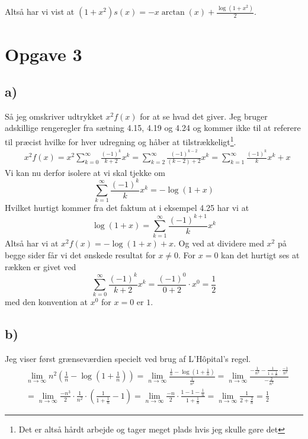\documentclass{article}
\newcommand{\lr}[1]{\left( #1\right)}
\begin{document}
Altså har vi vist at $(1 + x^2) s(x) = -x\arctan(x) + \frac{\log(1+x^2)}{2}$.

\section{Opgave 3}
\subsection*{a)}
Så jeg omskriver udtrykket $x^2f(x)$ for at se hvad det giver. Jeg bruger adskillige rengeregler
fra sætning 4.15, 4.19 og 4.24 \cite{an1} og kommer ikke til at referere til præcist hvilke for hver udregning
og håber at tilstrækkeligt\footnote{Det er altså hårdt arbejde og tager meget plads hvis jeg skulle gøre det}.
\begin{align*}
    &x^2 f(x) = x^2 \sum_{k=0}^{\infty} \frac{(-1)^k}{k+2} x^k 
    = \sum_{k=2}^{\infty} \frac{(-1)^{k-2}}{(k-2)+2} x^{k}
    = \sum_{k=1}^{\infty} \frac{(-1)^{k}}{k} x^{k} + x
\end{align*}
Vi kan nu derfor isolere at vi skal tjekke om
\[
    \sum_{k=1}^{\infty} \frac{(-1)^{k}}{k} x^{k} = -\log(1+x)
\]
Hvilket hurtigt kommer fra det faktum at i eksempel 4.25 \cite{an1} har vi at
\[
    \log(1+x) = \sum_{k=1}^{\infty} \frac{(-1)^{k+1}}{k} x^{k}
\]
Altså har vi at $x^2f(x) = -\log(1+x) + x$. Og ved at dividere med $x^2$ på begge sider
får vi det ønskede resultat for $x \ne 0$. 
For $x=0$ kan det hurtigt ses at rækken er givet ved
\[
    \sum_{k=0}^{\infty} \frac{(-1)^k}{k+2} x^k = \frac{(-1)^0}{0+2} \cdot x^0 = \frac{1}{2}
\]
med den konvention at $x^0$ for $x=0$ er $1$.

\subsection*{b)}
Jeg viser først grænseværdien specielt ved brug af L'Hôpital's regel.
\begin{align*}
    &\lim_{n \to \infty} n^2 \lr{ \frac{1}{n} - \log(1 + \frac{1}{n})}
    =\lim_{n \to \infty}  \frac{\frac{1}{n} - \log(1 + \frac{1}{n})}{\frac{1}{n^2}}
    =\lim_{n \to \infty}  \frac{-\frac{1}{n^2} - \frac{1}{1+ \frac{1}{n}} \cdot \frac{-1}{n^2}}{-\frac{2}{n^3}} \\
    &=\lim_{n \to \infty}  \frac{-n^3}{2} \cdot \frac{1}{n^2} \cdot \lr{\frac{1}{1+\frac{1}{n}} - 1}
    =\lim_{n \to \infty}  \frac{-n}{2} \cdot \frac{1 - 1 - \frac{1}{n}}{1+\frac{1}{n}}
    =\lim_{n \to \infty}  \frac{1}{2 + \frac{2}{n}} = \frac{1}{2}
\end{align*}








\end{document}
